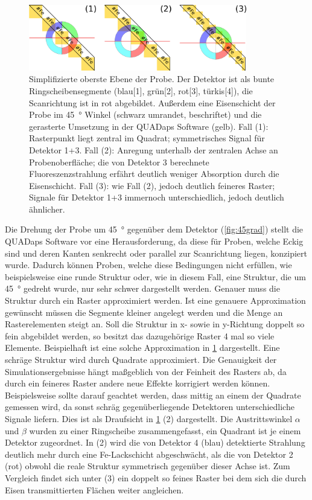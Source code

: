 \begin{figure}[H] 
  \centering
     \includegraphics[width=0.85\textwidth]{illustrations/45grad_challenge.png}
  \caption[Gegenüberstellung: großes und kleines Raster]{Simplifizierte oberste Ebene der Probe. Der Detektor ist als bunte Ringscheibensegmente (blau[1], grün[2], rot[3], türkis[4]), die Scanrichtung ist in rot abgebildet. Außerdem eine Eisenschicht der Probe im \SI{45}{\degree} Winkel (schwarz umrandet, beschriftet) und die gerasterte Umsetzung in der QUADaps Software (gelb). Fall (1): Rasterpunkt liegt zentral im Quadrat; symmetrisches Signal für Detektor 1+3. Fall (2): Anregung unterhalb der zentralen Achse an Probenoberfläche; die von Detektor 3 berechnete Fluoreszenzstrahlung erfährt deutlich weniger Absorption durch die Eisenschicht. Fall (3): wie Fall (2), jedoch deutlich feineres Raster; Signale für Detektor 1+3 immernoch unterschiedlich, jedoch deutlich ähnlicher.}
  \label{fig:45grad_challenge}
\end{figure} 

Die Drehung der Probe um \SI{45}{\degree} gegenüber dem Detektor (\cref{fig:45grad}) stellt die QUADaps Software vor eine Herausforderung, da diese für Proben, welche Eckig sind und deren Kanten senkrecht oder parallel zur Scanrichtung liegen, konzipiert wurde. Dadurch können Proben, welche diese Bedingungen nicht erfüllen, wie beispielsweise eine runde Struktur oder, wie in diesem Fall, eine Struktur, die um \SI{45}{\degree} gedreht wurde, nur sehr schwer dargestellt werden. Genauer muss die Struktur durch ein Raster approximiert werden. Ist eine genauere Approximation gewünscht müssen die Segmente kleiner angelegt werden und die Menge an Rasterelementen steigt an. Soll die Struktur in x- sowie in y-Richtung doppelt so fein abgebildet werden, so besitzt das dazugehörige Raster 4 mal so viele Elemente. Beispielhaft ist eine solche Approximation in \cref{fig:45grad_challenge} dargestellt. Eine schräge Struktur wird durch Quadrate approximiert. Die Genauigkeit der Simulationsergebnisse hängt maßgeblich von der Feinheit des Rasters ab, da durch ein feineres Raster andere neue Effekte korrigiert werden können. Beispielsweise sollte darauf geachtet werden, dass mittig an einem der Quadrate gemessen wird, da sonst schräg gegenüberliegende Detektoren unterschiedliche Signale liefern. Dies ist als Draufsicht in \cref{fig:45grad_challenge} (2) dargestellt. Die Austrittswinkel $\alpha$ und $\beta$ wurden zu einer Ringscheibe zusammengefasst, ein Quadrant ist je einem Detektor zugeordnet. In (2) wird die von Detektor 4 (blau) detektierte Strahlung deutlich mehr durch eine Fe-Lackschicht abgeschwächt, als die von Detektor 2 (rot) obwohl die reale Struktur symmetrisch gegenüber dieser Achse ist. Zum Vergleich findet sich unter (3) ein doppelt so feines Raster bei dem sich die durch Eisen transmittierten Flächen weiter angleichen. 



